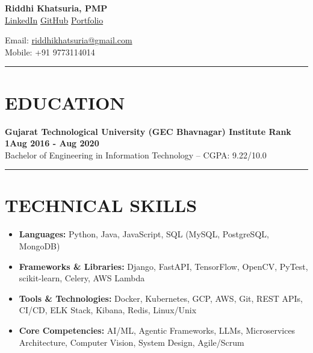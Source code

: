 \documentclass[10pt,a4paper]{article}
\begin{document}
\noindent
\begin{minipage}[t]{0.5\textwidth}
    \textbf{Riddhi Khatsuria, PMP\textregistered}\\[0.5pt]
    {\small\href{https://linkedin.com/in/riddhikhatsuria}{\color{linkcolor}LinkedIn} \textbf{\textbar{}} \href{https://github.com/riddhikhatsuria}{\color{linkcolor}GitHub} \textbf{\textbar{}} \href{https://riddhikhatsuria.wixsite.com/riddhi}{\color{linkcolor}Portfolio}}
\end{minipage}%
\begin{minipage}[t]{0.5\textwidth}
\raggedleft
    {\small Email: \href{mailto:riddhikhatsuria@gmail.com}{riddhikhatsuria@gmail.com}}\\[4pt]
    {\small Mobile: +91 9773114014}
\end{minipage}

\vspace{2pt}
\noindent\rule{\textwidth}{0.8pt}

\section*{EDUCATION}

\noindent
{\small\textbf{Gujarat Technological University (GEC Bhavnagar) \textbf{\textbar{}} Institute Rank 1}}\hfill{\small\textbf{Aug 2016 - Aug 2020}}\\[-2pt]
{\small Bachelor of Engineering in Information Technology -- CGPA: 9.22/10.0}

\vspace{2pt}
\noindent\rule{\textwidth}{0.8pt}

\section*{TECHNICAL SKILLS}

{\small
\begin{itemize}[leftmargin=0.15in, itemsep=1.5pt, topsep=0pt, parsep=0pt, partopsep=0pt, label=$\bullet$]
    \item \textbf{Languages:} Python, Java, JavaScript, SQL (MySQL, PostgreSQL, MongoDB)
    \item \textbf{Frameworks \& Libraries:} Django, FastAPI, TensorFlow, OpenCV, PyTest, scikit-learn, Celery, AWS Lambda
    \item \textbf{Tools \& Technologies:} Docker, Kubernetes, GCP, AWS, Git, REST APIs, CI/CD, ELK Stack, Kibana, Redis, Linux/Unix
    \item \textbf{Core Competencies:} AI/ML, Agentic Frameworks, LLMs, Microservices Architecture, Computer Vision, System Design, Agile/Scrum
\end{itemize}
}
\end{document}
